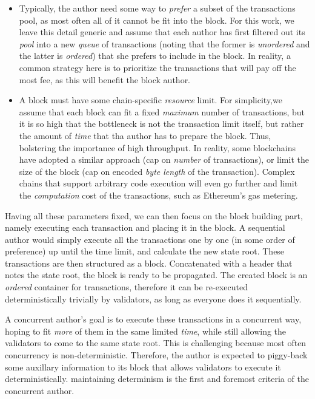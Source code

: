 \begin{itemize}
	\item Typically, the author need some way to \textit{prefer} a subset of the transactions pool,
	as most often all of it cannot be fit into the block. For this work, we leave this detail
	generic and assume that each author has first filtered out its \textit{pool} into a new
	\textit{queue} of transactions (noting that the former is \textit{unordered} and the latter is
	\textit{ordered}) that she prefers to include in the block. In reality, a common strategy here
	is to prioritize the transactions that will pay off the most fee, as this will benefit the block
	author.
	\item A block must have some chain-specific \textit{resource} limit. For simplicity,we assume
	that each block can fit a fixed \textit{maximum} number of transactions, but it is so high that
	the bottleneck is not the transaction limit itself, but rather the amount of \textit{time} that
	tha author has to prepare the block. Thus, bolstering the importance of high throughput. In
	reality, some blockchains have adopted a similar approach (cap on \textit{number} of
	transactions), or limit the size of the block (cap on encoded \textit{byte length} of the
	transaction). Complex chains that support arbitrary code execution will even go further and
	limit the \textit{computation} cost of the transactions, such as Ethereum's gas
	metering\cite{perezBrokenMetreAttacking2020}.
\end{itemize}

Having all these parameters fixed, we can then focus on the block building part, namely executing
each transaction and placing it in the block. A sequential author would simply execute all the
transactions one by one (in some order of preference) up until the time limit, and calculate the new
state root. These transactions are then structured as a block. Concatenated with a header that notes
the state root, the block is ready to be propagated. The created block is an \textit{ordered}
container for transactions, therefore it can be re-executed deterministically trivially by
validators, as long as everyone does it sequentially.

A concurrent author's goal is to execute these transactions in a concurrent way, hoping to fit
\textit{more} of them in the same limited \textit{time}, while still allowing the validators to come
to the same state root. This is challenging because most often concurrency is non-deterministic.
Therefore, the author is expected to piggy-back some auxillary information to its block that allows
validators to execute it deterministically. maintaining determinism is the first and foremost
criteria of the concurrent author.

